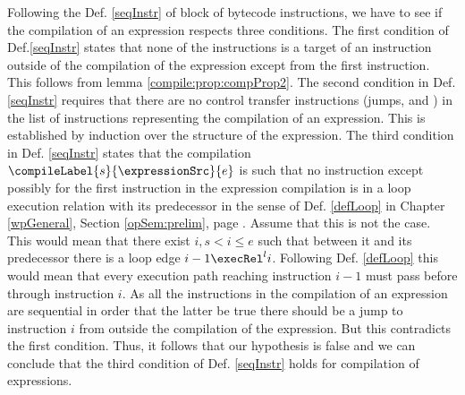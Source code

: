 Following the Def. \ref{seqInstr} of block of bytecode instructions,  we have to see if the compilation of an expression respects
three conditions.
The first condition of Def.\ref{seqInstr} states that none of the instructions is a target of an instruction
outside of the compilation of the expression except from the first instruction. This follows from lemma \ref{compile:prop:compProp2}. 
The second condition in Def. \ref{seqInstr}  requires that there are no control 
transfer instructions (jumps, \return and \athrow)  in the list of instructions representing the  compilation of an expression.
This is established by induction over the structure of the expression.
The third condition in Def. \ref{seqInstr} states that  the compilation $\compileLabel{s}{\expressionSrc}{e}$ is such that 
no instruction except possibly for the first instruction in the expression compilation is in a loop execution relation with its predecessor in the sense of 
Def.  \ref{defLoop} in Chapter \ref{wpGeneral}, Section \ref{opSem:prelim}, page \pageref{opSem:prelim}.
Assume that this is not the case. This would mean that there exist $i, s < i \le e  $  such that between it and its predecessor there is a loop edge
 $ i-1 \execRel^{l} i$.  Following Def. \ref{defLoop}  this would mean that every execution path reaching instruction $i-1$  must pass before through instruction $i$.
As all the instructions in the compilation of an expression are sequential in order that the latter be true there should be a jump to instruction $i$ from outside
the compilation of the expression. But this contradicts the first condition. Thus, it follows that our hypothesis is false and we can conclude that the third condition 
of Def. \ref{seqInstr} holds for compilation of expressions.
 \Qed \\

